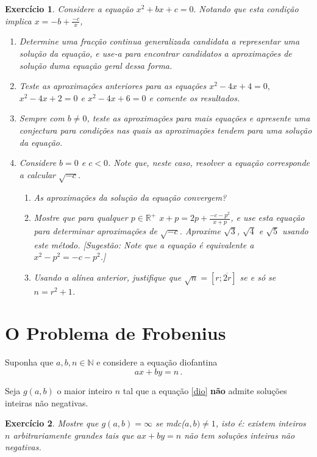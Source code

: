 \documentclass{article}
\newtheorem{ex}{Exercício}[section]
\begin{document}
\begin{ex}
Considere a equação $x^2+bx+c=0.$ Notando que esta condição implica $x=-b+\frac{-c}{x}$,
\begin{enumerate}
    \item Determine uma fracção continua generalizada candidata a representar uma solução da equação, e use-a para encontrar candidatos a aproximações de solução duma equação geral dessa forma. 
    \item Teste as aproximações anteriores para as equações $x^2-4x+4=0,$ $x^2-4x+2=0$ e $x^2-4x+6=0$ e comente os resultados.
    \item Sempre com $b\neq 0$, teste as aproximações para mais equações e apresente uma conjectura para condições nas quais as aproximações tendem para uma solução da equação.
    \item Considere $b=0$ e $c<0$. Note que, neste caso, resolver a equação corresponde a calcular $\sqrt{-c}$.
    \begin{enumerate}
        \item As aproximações da solução da equação convergem?
        \item Mostre que para qualquer $p\in \mathbb{R}^+$ $x+p=2p+\frac{-c-p^2}{x+p}$, e use esta equação para determinar aproximações de $\sqrt{-c}$. Aproxime $\sqrt{3}$, $\sqrt{4}$ e $\sqrt{5}$ usando este método. [Sugestão: Note que a equação é equivalente a $x^2-p^2=-c-p^2$.]
        \item Usando a alínea anterior, justifique que $\sqrt{n}=[r;\overline{2r}]$ se e só se $n=r^2+1$.
    \end{enumerate}
\end{enumerate}
\end{ex}

\section{O Problema de Frobenius}

Suponha que $a,b,n\in\mathbb{N}$ e considere a equação diofantina
\begin{equation}
ax+by=n \, .
\label{dio}
\end{equation}

Seja $g(a,b)$ o maior inteiro $n$ tal que a equação \eqref{dio} {\bf não} admite soluções inteiras não negativas.


\begin{ex}
Mostre que $g(a,b)=\infty$ se  mdc($a,b)\neq 1$, isto é: existem inteiros $n$ arbitrariamente grandes tais que $ax + by = n$ não tem soluções inteiras não negativas.
\end{ex}
\end{document}
